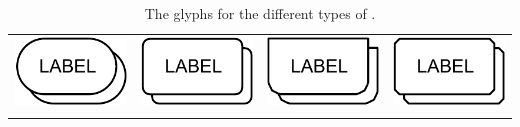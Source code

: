 \begin{table}[h]
\begin{tabu}{X[c,m]X[c,m]X[c,m]X[c,m]}
    \toprule
    \includegraphics[valign = m]{images/simple_chemical-multimer} & \includegraphics[valign = m]{images/macromolecule-multimer} & \includegraphics[valign = m]{images/genetic-multimer} & \includegraphics[valign = m]{images/complex-multimer}\\[0.5cm]
     &  &  & \\
	\bottomrule
\end{tabu}
\caption{The \PD glyphs for the different types of .}
\label{tab:multimer_containers}
\end{table}

% 

